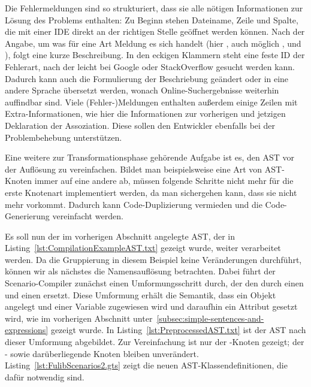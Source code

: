 Die Fehlermeldungen sind so strukturiert, dass sie alle nötigen Informationen zur Lösung des Problems enthalten:
Zu Beginn stehen Dateiname, Zeile und Spalte, die mit einer IDE direkt an der richtigen Stelle geöffnet werden können.
Nach der Angabe, um was für eine Art Meldung es sich handelt (hier , auch möglich ,  und ),
folgt eine kurze Beschreibung.
In den eckigen Klammern steht eine feste ID der Fehlerart, nach der leicht bei Google oder StackOverflow gesucht werden kann.
Dadurch kann auch die Formulierung der Beschriebung geändert oder in eine andere Sprache übersetzt werden,
wonach Online-Suchergebnisse weiterhin auffindbar sind.
Viele (Fehler-)Meldungen enthalten außerdem einige Zeilen mit Extra-Informationen,
wie hier die Informationen zur vorherigen und jetzigen Deklaration der Assoziation.
Diese sollen den Entwickler ebenfalls bei der Problembehebung unterstützen.

Eine weitere zur Transformationsphase gehörende Aufgabe ist es, den AST vor der Auflösung zu vereinfachen.
Bildet man beispielsweise eine Art von AST-Knoten immer auf eine andere ab,
müssen folgende Schritte nicht mehr für die erste Knotenart implementiert werden,
da man sichergehen kann, dass sie nicht mehr vorkommt.
Dadurch kann Code-Duplizierung vermieden und die Code-Generierung vereinfacht werden.

Es soll nun der im vorherigen Abschnitt angelegte AST, der in Listing~\ref{lst:CompilationExampleAST.txt} gezeigt wurde, weiter verarbeitet werden.
Da die Gruppierung in diesem Beispiel keine Veränderungen durchführt, können wir als nächstes die Namensauflösung betrachten.
Dabei führt der Scenario-Compiler zunächst einen Umformungsschritt durch, der den  durch einen  und einen  ersetzt.
Diese Umformung erhält die Semantik, dass ein Objekt angelegt und einer Variable zugewiesen wird und daraufhin ein Attribut gesetzt wird,
wie im vorherigen Abschnitt unter~\ref{subsec:simple-sentences-and-expressions} gezeigt wurde.
In Listing~\ref{lst:PreprocessedAST.txt} ist der AST nach dieser Umformung abgebildet.
Zur Vereinfachung ist nur der -Knoten gezeigt;
der - sowie darüberliegende Knoten bleiben unverändert.
Listing~\ref{lst:FulibScenarios2.gts} zeigt die neuen AST-Klassendefinitionen, die dafür notwendig sind.


